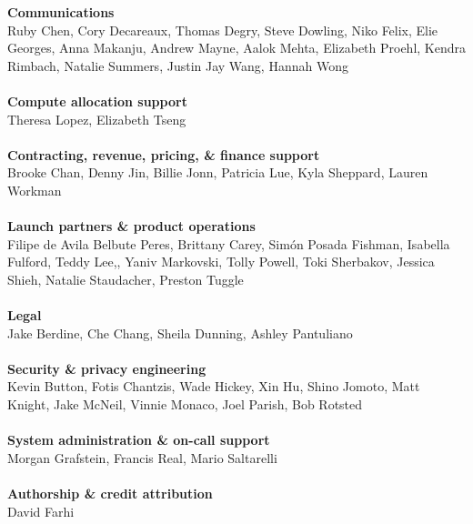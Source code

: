 \documentclass{article}
\newcommand{\creditlistheader}[1]{\textbf{#1}\footnotemark[\thefootnote]\\}
\newcommand{\creditlist}[2]{\creditlistheader{#1}#2\\
\\}
\begin{document}
\begin{multicols}{2}
\creditlist{Communications}{Ruby Chen, Cory Decareaux, Thomas Degry, Steve Dowling, Niko Felix, Elie Georges, Anna Makanju, Andrew Mayne, Aalok Mehta, Elizabeth Proehl, Kendra Rimbach, Natalie Summers, Justin Jay Wang, Hannah Wong}
\creditlist{Compute allocation support}{Theresa Lopez, Elizabeth Tseng}
\creditlist{Contracting, revenue, pricing, \& finance support}{Brooke Chan, Denny Jin, Billie Jonn, Patricia Lue, Kyla Sheppard, Lauren Workman}
\creditlist{Launch partners \& product operations}{Filipe de Avila Belbute Peres, Brittany Carey, Simón Posada Fishman, Isabella Fulford, Teddy Lee,, Yaniv Markovski, Tolly Powell, Toki Sherbakov, Jessica Shieh, Natalie Staudacher, Preston Tuggle}
\creditlist{Legal}{Jake Berdine, Che Chang, Sheila Dunning, Ashley Pantuliano}
\creditlist{Security \& privacy engineering}{Kevin Button, Fotis Chantzis, Wade Hickey, Xin Hu, Shino Jomoto, Matt Knight, Jake McNeil, Vinnie Monaco, Joel Parish, Bob Rotsted}
\creditlist{System administration \& on-call support}{Morgan Grafstein, Francis Real, Mario Saltarelli}
\creditlist{Authorship \& credit attribution}{David Farhi}

\end{multicols}
\end{document}
